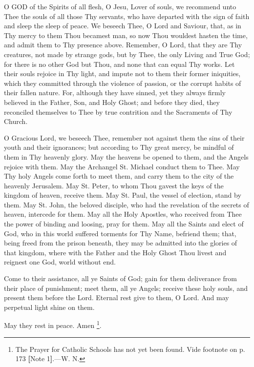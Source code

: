 
O GOD
of the Spirits of all flesh, O Jesu, Lover of souls, we recommend unto
Thee the souls of all those Thy servants, who have departed with the
sign of faith and sleep the sleep of peace. We beseech Thee, O Lord and
Saviour, that, as in Thy mercy to them Thou becamest man, so now Thou
wouldest hasten the time, and admit them to Thy presence above.
Remember, O Lord, that they are Thy creatures, not made by strange gods,
but by Thee, the only Living and True God; for there is no other God but
Thou, and none that can equal Thy works. Let their souls rejoice in Thy
light, and impute not to them their former iniquities, which they
committed through the violence of passion, or the corrupt habits of
their fallen nature. For, although they have sinned, yet they always
firmly believed in the Father, Son, and Holy Ghost; and before they
died, they reconciled themselves to Thee by true contrition and the
Sacraments of Thy Church.

O Gracious Lord, we beseech
Thee, remember not against them the sins of their youth and their
ignorances; but according to Thy great mercy, be mindful of them in Thy
heavenly glory. May the heavens be opened to them, and the Angels
rejoice with them. May the Archangel St. Michael conduct them to
Thee. May Thy holy Angels come forth to meet them, and carry them to the
city of the heavenly Jerusalem. May St. Peter, to whom Thou gavest the
keys of the kingdom of heaven, receive them. May St. Paul, the vessel of
election, stand by them. May St. John, the beloved disciple, who had the
revelation of the secrets of heaven, intercede for them. May all the
Holy Apostles, who received from Thee the power of binding and loosing,
pray for them. May all the Saints and elect of God, who in this world
suffered torments for Thy Name, befriend them; that, being freed from
the prison beneath, they may be admitted into the glories of that
kingdom, where with the Father and the Holy Ghost Thou livest and
reignest one God, world without end.

Come to their assistance, all ye
Saints of God; gain for them deliverance from their place of punishment;
meet them, all ye Angels; receive these holy souls, and present them
before the Lord. Eternal rest give to them, O Lord. And may perpetual
light shine on them.

May they rest in peace. Amen \footnote{The Prayer for Catholic Schools has not yet been found. Vide footnote on
p. 173 \textbf{[}Note 1\textbf{]}.—W. N.}.

